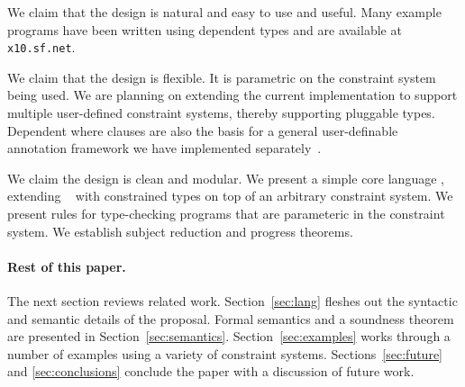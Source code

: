 We claim that the design is natural and easy to use and useful. Many
example programs have been written using dependent types and are
available at {\tt x10.sf.net}.

We claim that the design is flexible. It is parametric on the
constraint system being used. We are planning on extending the current
implementation to support multiple user-defined constraint systems,
thereby supporting pluggable types. Dependent where clauses are also
the basis for a general user-definable annotation framework we have
implemented separately~\cite{ns07-x10anno}. 

We claim the design is clean and modular. We present a simple core
language \CFJ, extending \FJ{}~\cite{FJ} with constrained types on top
of an arbitrary constraint system. We present rules for type-checking
\CFJ{} programs that are parameteric in the constraint system. 
We establish subject reduction and progress theorems. 

%

\paragraph{Rest of this paper.}

The next section reviews related work.
Section~\ref{sec:lang} fleshes out the syntactic and semantic details of the
proposal.
Formal semantics
and a soundness theorem
are presented in Section~\ref{sec:semantics}.
Section~\ref{sec:examples} works through a number of
examples using a variety of constraint systems.
Sections~\ref{sec:future}
and \ref{sec:conclusions} conclude the paper with a discussion of
future work.

